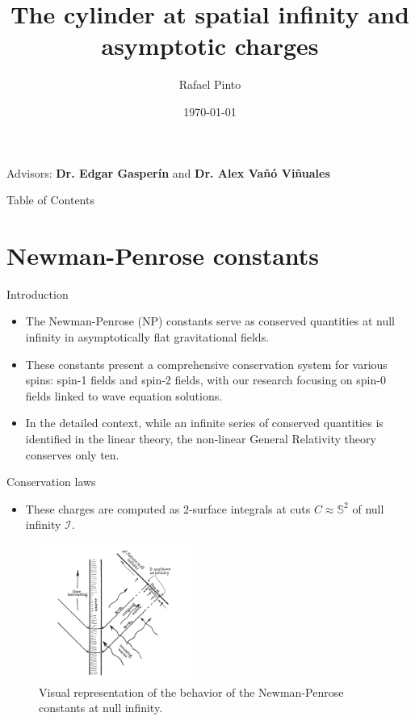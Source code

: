\documentclass{beamer}
\title[Spin-0 fields NP constants]{The cylinder at spatial infinity and asymptotic charges}
\author[Rafael Pinto]{Rafael Pinto}
\institute[CENTRA-GRIT]{Instituto Superior Técnico}
\date{\today}
\theoremstyle{remark}
\theoremstyle{plain}
\theoremstyle{plain}
\begin{document}
\begin{frame}
  \titlepage
  \vfill
  \begin{center}
    Advisors: \textbf{Dr. Edgar Gasper\'in} and \textbf{Dr. Alex Va\~{n}\'o Vi\~{n}uales}
  \end{center}
\end{frame}

\begin{frame}{Table of Contents}
  \tableofcontents
\end{frame}

\section{Newman-Penrose constants}
\begin{frame}{Introduction}
  \begin{itemize}
    \item The Newman-Penrose (NP) constants serve as conserved quantities at null infinity in asymptotically flat gravitational fields.
    \item These constants present a comprehensive conservation system for various spins: spin-1 fields and spin-2 fields, with our research focusing on spin-0 fields linked to wave equation solutions.
    \item In the detailed context, while an infinite series of conserved quantities is identified in the linear theory, the non-linear General Relativity theory conserves only ten.
  \end{itemize}
\end{frame}

\begin{frame}{Conservation laws}
  \begin{itemize}
    \item These charges are computed as 2-surface integrals at cuts ${C} \approx \mathbb{S}^2$ of null infinity $\mathscr{I}$.
  \end{itemize}
  \begin{figure}[h]
    \centering \includegraphics[width =0.45\textwidth]{penrose constants.png}
      \caption{Visual representation of the behavior of the Newman-Penrose constants at null infinity.}
  \end{figure}
\end{frame}
\end{document}

